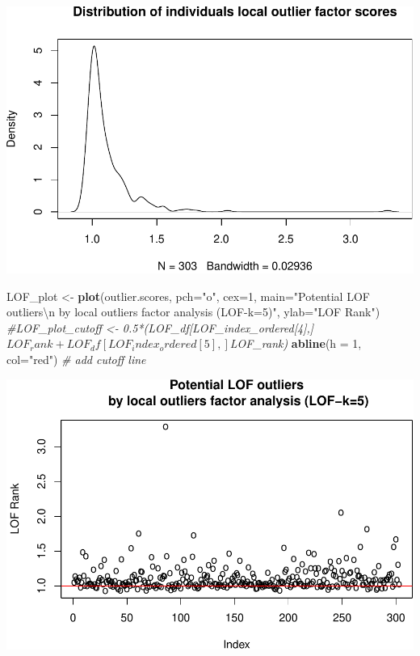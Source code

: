 \documentclass[]{article}
\newenvironment{Shaded}{\begin{snugshade}}{\end{snugshade}}
\newcommand{\KeywordTok}[1]{\textcolor[rgb]{0.13,0.29,0.53}{\textbf{#1}}}
\newcommand{\DataTypeTok}[1]{\textcolor[rgb]{0.13,0.29,0.53}{#1}}
\newcommand{\DecValTok}[1]{\textcolor[rgb]{0.00,0.00,0.81}{#1}}
\newcommand{\CharTok}[1]{\textcolor[rgb]{0.31,0.60,0.02}{#1}}
\newcommand{\StringTok}[1]{\textcolor[rgb]{0.31,0.60,0.02}{#1}}
\newcommand{\CommentTok}[1]{\textcolor[rgb]{0.56,0.35,0.01}{\textit{#1}}}
\newcommand{\NormalTok}[1]{#1}
\begin{document}
\includegraphics{project_report_files/figure-latex/unnamed-chunk-5-1.pdf}

\begin{Shaded}
\begin{Highlighting}[]
\NormalTok{LOF_plot <-}\StringTok{ }\KeywordTok{plot}\NormalTok{(outlier.scores, }
                 \DataTypeTok{pch=}\StringTok{"o"}\NormalTok{, }
                 \DataTypeTok{cex=}\DecValTok{1}\NormalTok{, }
                 \DataTypeTok{main=}\StringTok{"Potential LOF outliers}\CharTok{\textbackslash{}n}\StringTok{ by local outliers factor analysis (LOF-k=5)"}\NormalTok{,}
                 \DataTypeTok{ylab=}\StringTok{"LOF Rank"}\NormalTok{)}
\CommentTok{#LOF_plot_cutoff <- 0.5*(LOF_df[LOF_index_ordered[4],]$LOF_rank + LOF_df[LOF_index_ordered[5],]$LOF_rank)}
\KeywordTok{abline}\NormalTok{(}\DataTypeTok{h =} \DecValTok{1}\NormalTok{, }\DataTypeTok{col=}\StringTok{"red"}\NormalTok{)  }\CommentTok{# add cutoff line}
\end{Highlighting}
\end{Shaded}

\includegraphics{project_report_files/figure-latex/unnamed-chunk-5-2.pdf}
\end{document}
